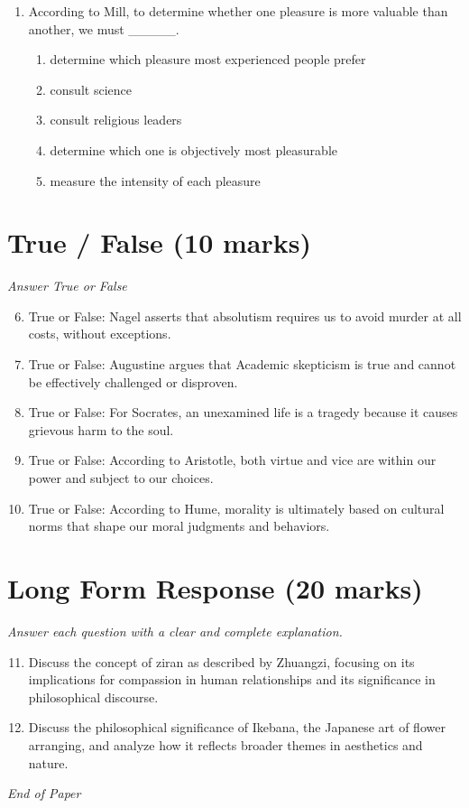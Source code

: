 \documentclass[12pt]{article}
\begin{document}
\begin{enumerate}[label=\arabic*.]
\begin{enumerate}[label=(\alph*)]
    \item failure to perform one's covenant.
    \item treating another person as a mere means.
    \item manipulating others for personal gain.
\end{enumerate}
\item According to Mill, to determine whether one pleasure is more valuable than another, we must \_\_\_\_\_.
\begin{enumerate}[label=(\alph*)]
    \item determine which pleasure most experienced people prefer
    \item consult science
    \item consult religious leaders
    \item determine which one is objectively most pleasurable
    \item measure the intensity of each pleasure
\end{enumerate}
\end{enumerate}

\section*{True / False (10 marks)}
\textit{Answer True or False}
\begin{enumerate}[label=\arabic*.]
\setcounter{enumi}{5}
\item True or False: Nagel asserts that absolutism requires us to avoid murder at all costs, without exceptions.
\item True or False: Augustine argues that Academic skepticism is true and cannot be effectively challenged or disproven.
\item True or False: For Socrates, an unexamined life is a tragedy because it causes grievous harm to the soul.
\item True or False: According to Aristotle, both virtue and vice are within our power and subject to our choices.
\item True or False: According to Hume, morality is ultimately based on cultural norms that shape our moral judgments and behaviors.
\end{enumerate}

\section*{Long Form Response (20 marks)}
\textit{Answer each question with a clear and complete explanation.}
\begin{enumerate}[label=\arabic*.]
\setcounter{enumi}{10}
\item Discuss the concept of ziran as described by Zhuangzi, focusing on its implications for compassion in human relationships and its significance in philosophical discourse.
\item Discuss the philosophical significance of Ikebana, the Japanese art of flower arranging, and analyze how it reflects broader themes in aesthetics and nature.
\end{enumerate}

\vfill
\noindent\textit{End of Paper}
\end{document}
